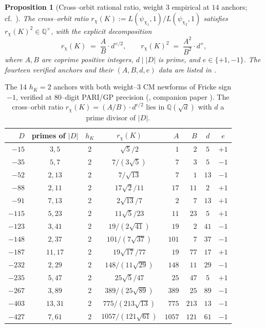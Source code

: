 \documentclass[11pt]{amsart}
\newtheorem{proposition}[theorem]{Proposition}
\theoremstyle{definition}
\theoremstyle{remark}
\newcommand{\Q}{\mathbb{Q}}
\begin{document}
\begin{proposition}[Cross--orbit rational ratio, weight \(3\)
empirical at \(14\) anchors; cf.\ \cite{Remondiere2026bsd}]
\label{prop:p4w3-formal}
The cross--orbit ratio
\(r_\chi(K) := L(\psi_{\chi_1}, 1)/L(\psi_{\chi_2}, 1)\) satisfies
\(r_\chi(K)^2 \in \Q^\times\), with the explicit decomposition
\[
   r_\chi(K) \;=\;
   \frac{A}{B} \cdot d^{\,e/2} ,
   \qquad
   r_\chi(K)^2 \;=\; \frac{A^2}{B^2} \cdot d^{\,e} ,
\]
where \(A, B\) are coprime positive integers, \(d \mid |D|\) is prime,
and \(e \in \{+1, -1\}\). The fourteen verified anchors and their
\((A, B, d, e)\) data are listed in .
\end{proposition}

\begin{table}[ht!]
\centering
\caption{The 14 \(h_K = 2\) anchors with both weight--3 CM newforms of
Fricke sign \(-1\), verified at \(80\)--digit PARI/GP precision
(, companion paper
\cite{Remondiere2026bsd}). The cross--orbit ratio \(r_\chi(K) =
(A/B)\cdot d^{e/2}\) lies in \(\Q(\sqrt d)\) with \(d\) a prime
divisor of \(|D|\).}
\label{tab:p4w3-anchors}
\begin{tabular}{rcccrrcc}
\toprule
\(D\) & primes of \(|D|\) & \(h_K\) & \(r_\chi(K)\) & \(A\) & \(B\) & \(d\) & \(e\) \\
\midrule
\(-15\)  & \(3, 5\)   & 2 & \(\sqrt 5 / 2\)        & \(1\)   & \(2\)   & \(5\)  & \(+1\) \\
\(-35\)  & \(5, 7\)   & 2 & \(7/(3\sqrt 5)\)       & \(7\)   & \(3\)   & \(5\)  & \(-1\) \\
\(-52\)  & \(2, 13\)  & 2 & \(7/\sqrt{13}\)        & \(7\)   & \(1\)   & \(13\) & \(-1\) \\
\(-88\)  & \(2, 11\)  & 2 & \(17\sqrt 2/11\)       & \(17\)  & \(11\)  & \(2\)  & \(+1\) \\
\(-91\)  & \(7, 13\)  & 2 & \(2\sqrt{13}/7\)       & \(2\)   & \(7\)   & \(13\) & \(+1\) \\
\(-115\) & \(5, 23\)  & 2 & \(11\sqrt 5/23\)       & \(11\)  & \(23\)  & \(5\)  & \(+1\) \\
\(-123\) & \(3, 41\)  & 2 & \(19/(2\sqrt{41})\)    & \(19\)  & \(2\)   & \(41\) & \(-1\) \\
\(-148\) & \(2, 37\)  & 2 & \(101/(7\sqrt{37})\)   & \(101\) & \(7\)   & \(37\) & \(-1\) \\
\(-187\) & \(11, 17\) & 2 & \(19\sqrt{17}/77\)     & \(19\)  & \(77\)  & \(17\) & \(+1\) \\
\(-232\) & \(2, 29\)  & 2 & \(148/(11\sqrt{29})\)  & \(148\) & \(11\)  & \(29\) & \(-1\) \\
\(-235\) & \(5, 47\)  & 2 & \(25\sqrt 5/47\)       & \(25\)  & \(47\)  & \(5\)  & \(+1\) \\
\(-267\) & \(3, 89\)  & 2 & \(389/(25\sqrt{89})\)  & \(389\) & \(25\)  & \(89\) & \(-1\) \\
\(-403\) & \(13, 31\) & 2 & \(775/(213\sqrt{13})\) & \(775\) & \(213\) & \(13\) & \(-1\) \\
\(-427\) & \(7, 61\)  & 2 & \(1057/(121\sqrt{61})\)& \(1057\)& \(121\) & \(61\) & \(-1\) \\
\bottomrule
\end{tabular}
\end{table}
\end{document}

